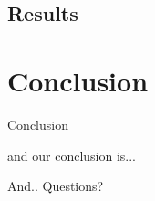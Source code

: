\documentclass{beamer}
\begin{document}
	\subsection{Results}	

\section{Conclusion}

\begin{frame}{Conclusion}

	and our conclusion is...

\end{frame}

\begin{frame}

	\begin{block}{And.. }
	Questions?
	\end{block}

\end{frame}
\end{document}
